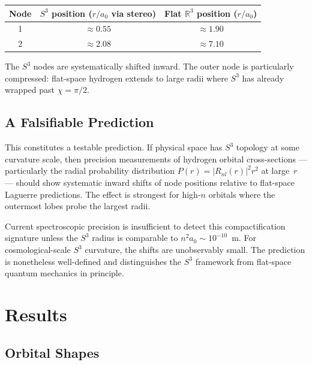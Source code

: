 \documentclass[12pt, a4paper]{article}
\theoremstyle{definition}
\theoremstyle{remark}
\newcommand{\Sthree}{S^3}
\newcommand{\R}{\mathbb{R}}
\begin{document}
\begin{center}
\renewcommand{\arraystretch}{1.2}
\begin{tabular}{ccc}
\toprule
Node & $\Sthree$ position ($r/a_0$ via stereo) & Flat $\R^3$ position ($r/a_0$) \\
\midrule
1 & $\approx 0.55$ & $\approx 1.90$ \\
2 & $\approx 2.08$ & $\approx 7.10$ \\
\bottomrule
\end{tabular}
\end{center}

The $\Sthree$ nodes are systematically shifted inward. The outer node is
particularly compressed: flat-space hydrogen extends to large radii where
$\Sthree$ has already wrapped past $\chi = \pi/2$.

\subsection{A Falsifiable Prediction}

This constitutes a testable prediction. If physical space has $\Sthree$
topology at some curvature scale, then precision measurements of hydrogen
orbital cross-sections --- particularly the radial probability distribution
$P(r) = |R_{nl}(r)|^2 r^2$ at large~$r$ --- should show systematic inward
shifts of node positions relative to flat-space Laguerre predictions. The
effect is strongest for high-$n$ orbitals where the outermost lobes probe
the largest radii.

Current spectroscopic precision is insufficient to detect this
compactification signature unless the $\Sthree$ radius is comparable to
$n^2 a_0 \sim 10^{-10}$~m. For cosmological-scale $\Sthree$ curvature, the
shifts are unobservably small. The prediction is nonetheless well-defined
and distinguishes the $\Sthree$ framework from flat-space quantum mechanics
in principle.


\section{Results}
\label{sec:results}

\subsection{Orbital Shapes}
\end{document}
